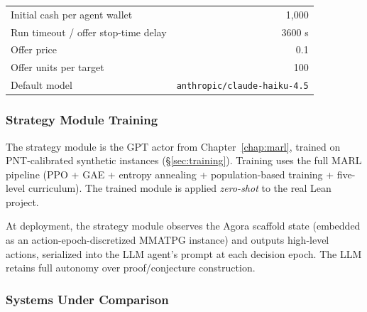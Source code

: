 \begin{table}[ht]
\begin{tabular}{lr}
\midrule
Initial cash per agent wallet & 1,000 \\
Run timeout / offer stop-time delay & 3600 s \\
Offer price & 0.1 \\
Offer units per target & 100 \\
Default model & \texttt{anthropic/claude-haiku-4.5} \\
\bottomrule
\end{tabular}
\end{table}



\subsubsection{Strategy Module Training}\label{sec:strategy-training}

The strategy module is the GPT actor from Chapter~\ref{chap:marl}, trained on PNT-calibrated synthetic instances (\S\ref{sec:training}). Training uses the full MARL pipeline (PPO + GAE + entropy annealing + population-based training + five-level curriculum). The trained module is applied \emph{zero-shot} to the real Lean project.

At deployment, the strategy module observes the Agora scaffold state (embedded as an action-epoch-discretized MMATPG instance) and outputs high-level actions, serialized into the LLM agent's prompt at each decision epoch. The LLM retains full autonomy over proof/conjecture construction.


\subsubsection{Systems Under Comparison}\label{sec:systems}

